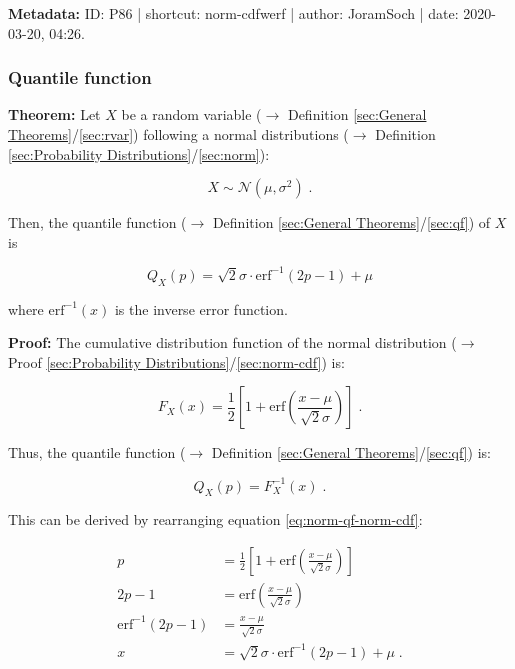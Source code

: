 \documentclass[a4paper,12pt,twoside]{book}
\begin{document}
\vspace{1em}
\textbf{Metadata:} ID: P86 | shortcut: norm-cdfwerf | author: JoramSoch | date: 2020-03-20, 04:26.
\vspace{1em}



\subsubsection[\textbf{Quantile function}]{Quantile function} \label{sec:norm-qf}
\setcounter{equation}{0}

\textbf{Theorem:} Let $X$ be a random variable ($\rightarrow$ Definition \ref{sec:General Theorems}/\ref{sec:rvar}) following a normal distributions ($\rightarrow$ Definition \ref{sec:Probability Distributions}/\ref{sec:norm}):

\begin{equation} \label{eq:norm-qf-norm}
X \sim \mathcal{N}(\mu, \sigma^2) \; .
\end{equation}

Then, the quantile function ($\rightarrow$ Definition \ref{sec:General Theorems}/\ref{sec:qf}) of $X$ is

\begin{equation} \label{eq:norm-qf-norm-qf}
Q_X(p) = \sqrt{2}\sigma \cdot \mathrm{erf}^{-1}(2p-1) + \mu
\end{equation}

where $\mathrm{erf}^{-1}(x)$ is the inverse error function.


\vspace{1em}
\textbf{Proof:} The cumulative distribution function of the normal distribution ($\rightarrow$ Proof \ref{sec:Probability Distributions}/\ref{sec:norm-cdf}) is:

\begin{equation} \label{eq:norm-qf-norm-cdf}
F_X(x) = \frac{1}{2} \left[ 1 + \mathrm{erf}\left( \frac{x-\mu}{\sqrt{2} \sigma} \right) \right] \; .
\end{equation}

Thus, the quantile function ($\rightarrow$ Definition \ref{sec:General Theorems}/\ref{sec:qf}) is:

\begin{equation} \label{eq:norm-qf-norm-qf-s1}
Q_X(p) = F_X^{-1}(x) \; .
\end{equation}

This can be derived by rearranging equation \eqref{eq:norm-qf-norm-cdf}:

\begin{equation} \label{eq:norm-qf-norm-qf-s2}
\begin{split}
p &= \frac{1}{2} \left[ 1 + \mathrm{erf}\left( \frac{x-\mu}{\sqrt{2} \sigma} \right) \right] \\
2 p - 1 &= \mathrm{erf}\left( \frac{x-\mu}{\sqrt{2} \sigma} \right) \\
\mathrm{erf}^{-1}(2p-1) &= \frac{x-\mu}{\sqrt{2} \sigma} \\
x &= \sqrt{2}\sigma \cdot \mathrm{erf}^{-1}(2p-1) + \mu \; .
\end{split}
\end{equation}
\end{document}
